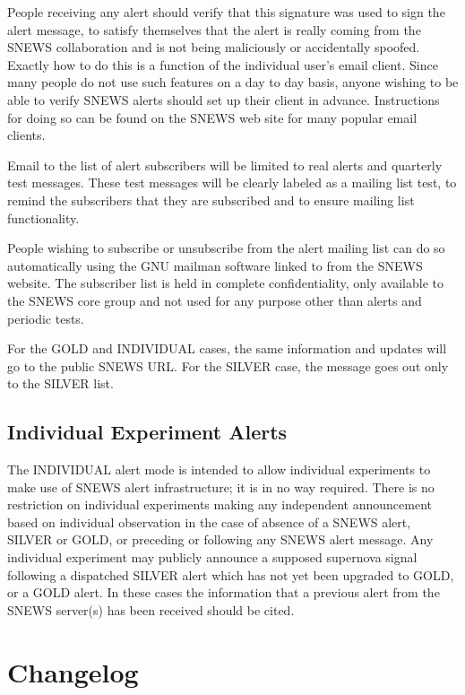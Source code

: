 \documentclass{article}
\begin{document}
People receiving any alert should verify that this signature was used to
sign the alert message, to satisfy themselves that the alert is really
coming from the SNEWS collaboration and is not being maliciously or
accidentally spoofed.  Exactly how to do this is a function of the
individual user's email client.  Since many people do not use such
features on a day to day basis, anyone wishing to be able to verify
SNEWS alerts should set up their client in advance.  Instructions for
doing so can be found on the SNEWS web site for many popular email
clients.  

Email to the list of alert subscribers will be limited to real alerts
and quarterly test messages.  These test messages will be clearly
labeled as a mailing list test, to remind the subscribers that they are
subscribed and to ensure mailing list functionality.

People wishing to subscribe or unsubscribe from the alert mailing list
can do so automatically using the GNU mailman software linked to from
the SNEWS website.  The subscriber list is held in complete
confidentiality, only available to the SNEWS core group and not used for
any purpose other than alerts and periodic tests.


For the GOLD and INDIVIDUAL cases, the same information and updates will go
to the public SNEWS URL.
For the SILVER case, the message goes out only to the SILVER list.

\subsection{Individual Experiment Alerts}

The INDIVIDUAL alert mode is intended to allow individual
experiments to make use of SNEWS alert infrastructure; it is
in no way required.
There is no restriction on individual experiments making any independent
announcement based on individual observation in the case of absence of
a SNEWS alert, SILVER or GOLD, or preceding or following any SNEWS
alert message.  Any individual experiment may publicly announce a
supposed supernova signal following a dispatched SILVER alert which
has not yet been upgraded to GOLD, or a GOLD alert.  In these cases
the information that a previous alert from the SNEWS server(s) has
been received should be cited.
                                        
\section{Changelog}
\end{document}
